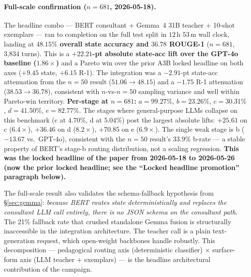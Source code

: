 \documentclass[11pt]{article}
\begin{document}
\paragraph{Full-scale confirmation ($n{=}681$, 2026-05-18).} The headline combo --- BERT consultant + Gemma~4 31B teacher + 10-shot exemplars --- ran to completion on the full test split in $12$\,h $53$\,m wall clock, landing at \textbf{$\boldsymbol{48.15\%}$ overall state accuracy and $\boldsymbol{36.78}$ ROUGE-1} ($n{=}681$, 3{,}834 turns). This is a \textbf{$+22.21$-pt absolute state-acc lift over the GPT-4o baseline ($1.86\times$)} and a Pareto win over the prior A3B locked headline on both axes ($+9.45$ state, $+6.15$ R-1). The integration was a $-2.91$-pt state-acc attenuation from the $n{=}50$ result ($51.06 \to 48.15$) and a $-1.75$ R-1 attenuation ($38.53 \to 36.78$), consistent with $n$-vs-$n{=}50$ sampling variance and well within Pareto-win territory. \textbf{Per-stage at $n{=}681$:} $a{=}99.27\%$, $b{=}23.26\%$, $c{=}30.31\%$, $d{=}41.50\%$, $e{=}82.77\%$. The stages where general-purpose LLMs collapse on this benchmark (c at $4.70\%$, d at $5.04\%$) post the largest absolute lifts: $+25.61$ on c ($6.4\times$), $+36.46$ on d ($8.2\times$), $+70.85$ on e ($6.9\times$). The single weak stage is b ($-13.67$ vs.\ GPT-4o), consistent with the $n{=}50$ result's $33.9\%$ b-rate --- a stable property of BERT's stage-b routing distribution, not a scaling regression. \textbf{This was the locked headline of the paper from 2026-05-18 to 2026-05-26 (now the prior locked headline; see the ``Locked headline promotion'' paragraph below).}

The full-scale result also validates the schema-fallback hypothesis from \S\ref{sec:gemma}: \emph{because BERT routes state deterministically and replaces the consultant LLM call entirely, there is no JSON schema on the consultant path}. The 21\% fallback rate that crushed standalone Gemma fusion is structurally inaccessible in the integration architecture. The teacher call is a plain text-generation request, which open-weight backbones handle robustly. This decomposition --- pedagogical routing axis (deterministic classifier) $\times$ surface-form axis (LLM teacher + exemplars) --- is the headline architectural contribution of the campaign.
\end{document}
